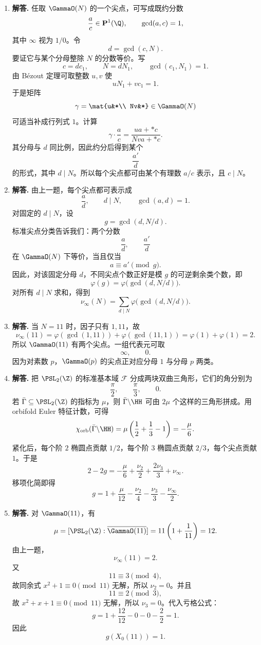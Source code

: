 \begin{enumerate}[label=\textbf{\arabic*.}, leftmargin=*, itemsep=1em]
\item \textbf{解答.} 任取 $\GammaO(N)$ 的一个尖点，可写成既约分数
\[
\frac ac\in \mathbf P^1(\Q),\qquad \gcd(a,c)=1,
\]
其中 $\infty$ 视为 $1/0$。令
\[
d=\gcd(c,N).
\]
要证它与某个分母整除 $N$ 的分数等价。写
\[
c=dc_1,\qquad N=dN_1,\qquad \gcd(c_1,N_1)=1.
\]
由 Bézout 定理可取整数 $u,v$ 使
\[
uN_1+vc_1=1.
\]
于是矩阵
\[
\gamma=\mat{u&*\\ Nv&*}\in \GammaO(N)
\]
可适当补成行列式 $1$。计算
\[
\gamma\cdot \frac ac=\frac{ua+*c}{Nva+*c}.
\]
其分母与 $d$ 同比例，因此约分后得到某个
\[
\frac{a'}d
\]
的形式，其中 $d\mid N$。所以每个尖点都可由某个有理数 $a/c$ 表示，且 $c\mid N$。

\item \textbf{解答.} 由上一题，每个尖点都可表示成
\[
\frac ad,\qquad d\mid N,\qquad \gcd(a,d)=1.
\]
对固定的 $d\mid N$，设
\[
g=\gcd(d,N/d).
\]
标准尖点分类告诉我们：两个分数
\[
\frac ad,\qquad \frac{a'}d
\]
在 $\GammaO(N)$ 下等价，当且仅当
\[
a\equiv a'\pmod g.
\]
因此，对该固定分母 $d$，不同尖点个数正好是模 $g$ 的可逆剩余类个数，即
\[
\varphi(g)=\varphi\!\bigl(\gcd(d,N/d)\bigr).
\]
对所有 $d\mid N$ 求和，得到
\[
\nu_{\infty}(N)=\sum_{d\mid N}\varphi\!\bigl(\gcd(d,N/d)\bigr).
\]

\item \textbf{解答.} 当 $N=11$ 时，因子只有 $1,11$，故
\[
\nu_\infty(11)
=\varphi(\gcd(1,11))+\varphi(\gcd(11,1))
=\varphi(1)+\varphi(1)=2.
\]
所以 $\GammaO(11)$ 有两个尖点。一组代表元可取
\[
\infty,\qquad 0.
\]
因为对素数 $p$，$\GammaO(p)$ 的尖点正对应分母 $1$ 与分母 $p$ 两类。

\item \textbf{解答.} 把 $\PSL_2(\Z)$ 的标准基本域 $\mathcal F$ 分成两块双曲三角形，它们的角分别为
\[
\frac{\pi}{2},\qquad \frac{\pi}{3},\qquad 0.
\]
若 $\bar\Gamma\subseteq \PSL_2(\Z)$ 的指标为 $\mu$，则 $\bar\Gamma\backslash\HH$ 可由 $2\mu$ 个这样的三角形拼成。用 orbifold Euler 特征计数，可得
\[
\chi_{\mathrm{orb}}(\bar\Gamma\backslash\HH)
=\mu\left(\frac12+\frac13-1\right)
=-\frac{\mu}{6}.
\]
紧化后，每个阶 $2$ 椭圆点贡献 $1/2$，每个阶 $3$ 椭圆点贡献 $2/3$，每个尖点贡献 $1$。于是
\[
2-2g=-\frac{\mu}{6}+\frac{\nu_2}{2}+\frac{2\nu_3}{3}+\nu_\infty.
\]
移项化简即得
\[
g=1+\frac{\mu}{12}-\frac{\nu_2}{4}-\frac{\nu_3}{3}-\frac{\nu_\infty}{2}.
\]

\item \textbf{解答.} 对 $\GammaO(11)$，有
\[
\mu=[\PSL_2(\Z):\overline{\GammaO(11)}]
=11\left(1+\frac1{11}\right)=12.
\]
由上一题，
\[
\nu_\infty(11)=2.
\]
又
\[
11\equiv 3\pmod 4,
\]
故同余式 $x^2+1\equiv0\pmod{11}$ 无解，所以 $\nu_2=0$。并且
\[
11\equiv 2\pmod 3,
\]
故 $x^2+x+1\equiv0\pmod{11}$ 无解，所以 $\nu_3=0$。代入亏格公式：
\[
g=1+\frac{12}{12}-0-0-\frac22=1.
\]
因此
\[
g(X_0(11))=1.
\]


\end{enumerate}
